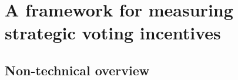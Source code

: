 \documentclass[11pt,a4paper]{article}
\begin{document}

\section{A framework for measuring strategic voting incentives}

\subsection{Non-technical overview}
\end{document}
